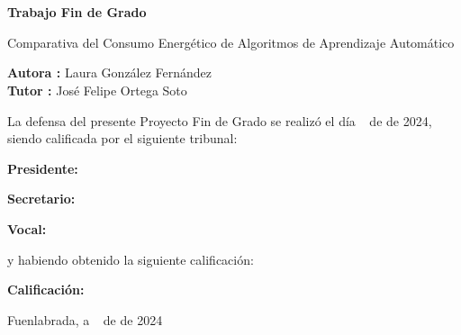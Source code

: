 \documentclass[a4paper, 12pt, oneside]{book}
\begin{document}
\chapter*{}
\thispagestyle{empty}

\vspace{-4cm}
\begin{center}
\LARGE
\textbf{Trabajo Fin de Grado}

\vspace{1cm}
\large
Comparativa del Consumo Energético de Algoritmos de Aprendizaje Automático

\vspace{1cm}
\large
\textbf{Autora :} Laura González Fernández  \\
\textbf{Tutor :} José Felipe Ortega Soto

\end{center}

\vspace{1cm}
La defensa del presente Proyecto Fin de Grado se realizó el día \qquad$\;\,$ de \qquad\qquad\qquad\qquad \newline de 2024, siendo calificada por el siguiente tribunal:


\vspace{0.5cm}
\textbf{Presidente:}

\vspace{0.8cm}
\textbf{Secretario:}

\vspace{0.8cm}
\textbf{Vocal:}


\vspace{0.8cm}
y habiendo obtenido la siguiente calificación:

\vspace{0.8cm}
\textbf{Calificación:}


\vspace{0.8cm}
\begin{flushright}
Fuenlabrada, a \qquad$\;\,$ de \qquad\qquad\qquad\qquad de 2024
\end{flushright}


\end{document}
